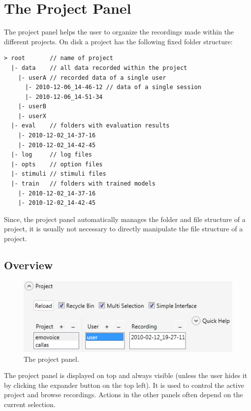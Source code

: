 \chapter{The Project Panel}\label{lab:project}

The project panel helps the user to organize the recordings made within the different projects. On disk a project has the following fixed folder structure:

\begin{verbatim}
> root       // name of project
  |- data    // all data recorded within the project
    |- userA // recorded data of a single user
      |- 2010-12-06_14-46-12 // data of a single session
      |- 2010-12-06_14-51-34
    |- userB
    |- userX
  |- eval    // folders with evaluation results
    |- 2010-12-02_14-37-16
    |- 2010-12-02_14-42-45
  |- log     // log files
  |- opts    // option files
  |- stimuli // stimuli files
  |- train   // folders with trained models
    |- 2010-12-02_14-37-16
    |- 2010-12-02_14-42-45
\end{verbatim}

Since, the project panel automatically manages the folder and file structure of a project, it is usually not necessary to directly manipulate the file structure of a project.

\section{Overview}\label{lab:project_overview}

\begin{figure}[h]
\begin{center}
\includegraphics[scale=0.5]{pics/project_gui.png}
\end{center}
\vspace{-0.5cm}
\caption{The project panel.}
\label{fig:project_gui}
\end{figure}

The project panel is displayed on top and always visible (unless the user hides it by clicking the expander button on the top left). It is used to control the active project and browse recordings. Actions in the other panels often depend on the current selection.

